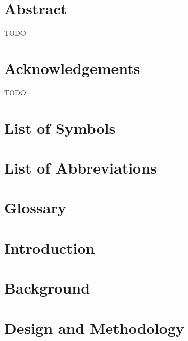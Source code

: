 \documentclass[
  a4paper,
  12pt,
  twoside,
  open=any,
  bibliography=totoc,
  listof=totoc
]{scrreprt}
\begin{document}



\chapter*{Abstract}
TODO

\chapter*{Acknowledgements}
TODO

\tableofcontents
\listoffigures
\listoftables
\lstlistoflistings

\chapter*{List of Symbols}\label{ch:symbols}


\chapter*{List of Abbreviations}\label{ch:abbreviations}


\chapter*{Glossary}\label{ch:glossary}


\clearpage


\chapter{Introduction}\label{ch:introduction}


\chapter{Background}\label{ch:background}


\chapter{Design and Methodology}\label{ch:design}

\end{document}
